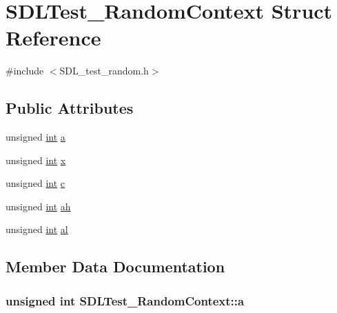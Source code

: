 \hypertarget{struct_s_d_l_test___random_context}{}\section{S\+D\+L\+Test\+\_\+\+Random\+Context Struct Reference}
\label{struct_s_d_l_test___random_context}


{\ttfamily \#include $<$S\+D\+L\+\_\+test\+\_\+random.\+h$>$}

\subsection*{Public Attributes}
\begin{DoxyCompactItemize}
\item 
unsigned \hyperlink{_s_d_l__thread_8h_a6a64f9be4433e4de6e2f2f548cf3c08e}{int} \hyperlink{struct_s_d_l_test___random_context_a24f830d6cb476c96fbe325c99331e45f}{a}
\item 
unsigned \hyperlink{_s_d_l__thread_8h_a6a64f9be4433e4de6e2f2f548cf3c08e}{int} \hyperlink{struct_s_d_l_test___random_context_a8bd6d1b4e1677ed1c06f5cc09f1af5b6}{x}
\item 
unsigned \hyperlink{_s_d_l__thread_8h_a6a64f9be4433e4de6e2f2f548cf3c08e}{int} \hyperlink{struct_s_d_l_test___random_context_a17a6a7e7b68a33c67d9b74c8c7c33198}{c}
\item 
unsigned \hyperlink{_s_d_l__thread_8h_a6a64f9be4433e4de6e2f2f548cf3c08e}{int} \hyperlink{struct_s_d_l_test___random_context_a2c8d2f1ee16cdfd38361b8f03b3fdb85}{ah}
\item 
unsigned \hyperlink{_s_d_l__thread_8h_a6a64f9be4433e4de6e2f2f548cf3c08e}{int} \hyperlink{struct_s_d_l_test___random_context_a0e2bccd3611d383d6510c6c828aa54c4}{al}
\end{DoxyCompactItemize}


\subsection{Member Data Documentation}
\subsubsection[{\texorpdfstring{a}{a}}]{\setlength{\rightskip}{0pt plus 5cm}unsigned {\bf int} S\+D\+L\+Test\+\_\+\+Random\+Context\+::a}\hypertarget{struct_s_d_l_test___random_context_a24f830d6cb476c96fbe325c99331e45f}{}\label{struct_s_d_l_test___random_context_a24f830d6cb476c96fbe325c99331e45f}
